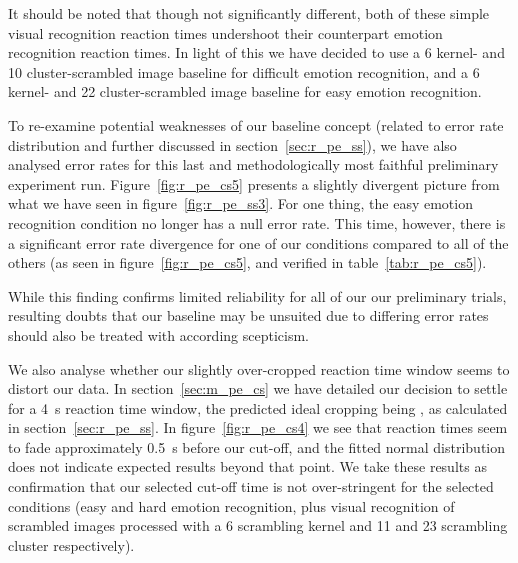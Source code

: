 	    It should be noted that though not significantly different, both of these simple visual recognition reaction times undershoot their counterpart emotion recognition reaction times.
	    In light of this we have decided to use a \SI{6}{\pixel} kernel- and \SI{10}{\pixel} cluster-scrambled image baseline for difficult emotion recognition, 
	    and a \SI{6}{\pixel} kernel- and \SI{22}{\pixel} cluster-scrambled image baseline for easy emotion recognition.
	    
	    
	    To re-examine potential weaknesses of our baseline concept (related to error rate distribution and further discussed in section~\ref{sec:r_pe_ss}), we have also analysed error rates for this last and methodologically most faithful preliminary experiment run.
	    Figure~\ref{fig:r_pe_cs5} presents a slightly divergent picture from what we have seen in figure~\ref{fig:r_pe_ss3}.
	    For one thing, the easy emotion recognition condition no longer has a null error rate.
	    This time, however, there is a significant error rate divergence for one of our conditions compared to all of the others (as seen in figure~\ref{fig:r_pe_cs5}, and verified in table~\ref{tab:r_pe_cs5}).
	
	    While this finding confirms limited reliability for all of our our preliminary trials, resulting doubts that our baseline may be unsuited due to differing error rates should also be treated with according scepticism.
	    
	    We also analyse whether our slightly over-cropped reaction time window seems to distort our data.
	    In section~\ref{sec:m_pe_cs} we have detailed our decision to settle for a \SI{4}{\second} reaction time window, the predicted ideal cropping being , as calculated in section~\ref{sec:r_pe_ss}.
	    In figure~\ref{fig:r_pe_cs4} we see that reaction times seem to fade approximately \SI{0.5}{\second} before our cut-off, and the fitted normal distribution does not indicate expected results beyond that point.
	    We take these results as confirmation that our selected cut-off time is not over-stringent for the selected conditions (easy and hard emotion recognition, plus visual recognition of scrambled images processed with a \SI{6}{\pixel} scrambling kernel and \SI{11}{\pixel} and \SI{23}{\pixel} scrambling cluster respectively).	    
	    
